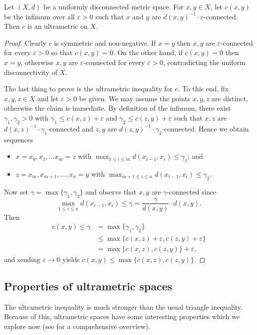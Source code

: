 Let \( (X,d) \) be a uniformly disconnected metric space. For \( x,y \in X \), let \( c(x,y) \) be the infimum over all \( \varepsilon > 0 \) such that \( x \) and \( y \) are \( d(x,y)^{-1} \cdot \varepsilon  \)-connected. Then \( c \) is an ultrametric on \( X \).
\begin{proof}
Clearly \( c \) is symmetric and non-negative. If \( x = y \) then \( x,y \) are \( \varepsilon  \)-connected for every \( \varepsilon > 0 \) so that \( c(x,y) = 0 \). On the other hand, if \( c(x,y) = 0  \) then \( x = y \), otherwise \( x,y \) are \( \varepsilon  \)-connected for every \( \varepsilon > 0 \), contradicting the uniform disconnectivity of \( X \).

The last thing to prove is the ultrametric inequality for \( c \). To this end, fix \( x,y,z \in X \) and let \( \varepsilon > 0 \) be given. We may assume the points \( x,y,z \) are distinct, otherwise the claim is immediate. By definition of the infimum, there exist \( \gamma_1, \gamma_2 > 0 \) with \(\gamma_1 \leq c(x,z) + \varepsilon \) and \(\gamma_2 \leq c(z,y) + \varepsilon  \) such that \( x,z \) are \( d(x,z)^{-1} \cdot \gamma_1 \)-connected and \( z,y \) are \(d(z,y)^{-1} \cdot \gamma_2 \)-connected. Hence we obtain sequences
\begin{itemize}[leftmargin=0.8cm]
	\item \( x = x_0, x_1, \hdots x_{m} = z  \) with \( \max_{1 \leq i \leq m} d(x_{i-1} , x_{i}) \leq \gamma_1 \); and
	\item \( z = x_{m} , x_{m+1} , \hdots , x_{n} = y \) with \( \max_{m+1 \leq i \leq n} d(x_{i-1} , x_{i}) \leq \gamma_2 \). 
\end{itemize}
Now set \( \gamma = \max \{ \gamma_1, \gamma_2 \}  \) and observe that \( x,y \) are \( \gamma \)-connected since \[ \max _{1 \leq i \leq n} d(x_{i-1} , x_{i} ) \leq \gamma = \frac{\gamma}{d(x,y)} \cdot d(x,y). \] 
Then
\begin{align*}
	c(x,y) \leq \gamma &= \max \{ \gamma_1, \gamma_2 \} \\
	       &\leq \max \{ c(x,z) + \varepsilon , c(z,y) + \varepsilon  \} \\
	       &= \max \{ c(x,z), c(z,y) \} + \varepsilon,
\end{align*}
and sending \( \varepsilon \to 0 \) yields \( c(x,y) \leq \max \{ c(x,z), c(z,y) \} \).
\end{proof}
\subsection{Properties of ultrametric spaces} The ultrametric inequality is much stronger than the usual triangle inequality. Because of this, ultrametric spaces have some interesting properties which we explore now (see \cite{ultrametric:1985} for a comprehensive overview).


